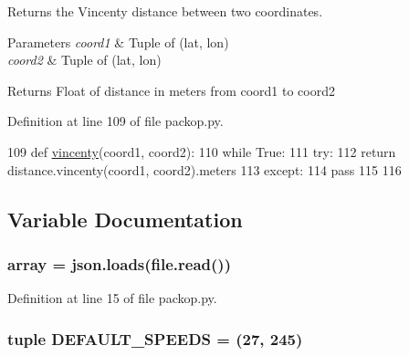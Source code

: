 Returns the Vincenty distance between two coordinates. 


\begin{DoxyParams}{Parameters}
{\em coord1} & Tuple of (lat, lon) \\
\hline
{\em coord2} & Tuple of (lat, lon)\\
\hline
\end{DoxyParams}
\begin{DoxyReturn}{Returns}
Float of distance in meters from coord1 to coord2 
\end{DoxyReturn}


Definition at line 109 of file packop.\+py.


\begin{DoxyCode}
109 \textcolor{keyword}{def }\hyperlink{namespacesrc_1_1packop_ac16b65508182630b4ab800bffc0d06f0}{vincenty}(coord1, coord2):
110     \textcolor{keywordflow}{while} \textcolor{keyword}{True}:
111         \textcolor{keywordflow}{try}:
112             \textcolor{keywordflow}{return} distance.vincenty(coord1, coord2).meters
113         \textcolor{keywordflow}{except}:
114             \textcolor{keywordflow}{pass}
115 
116 
\end{DoxyCode}


\subsection{Variable Documentation}
\subsubsection[{\texorpdfstring{array}{array}}]{\setlength{\rightskip}{0pt plus 5cm}array = json.\+loads(file.\+read())}\hypertarget{namespacesrc_1_1packop_a41ab4b8b4e6b05e8489555b1bbc7f845}{}\label{namespacesrc_1_1packop_a41ab4b8b4e6b05e8489555b1bbc7f845}


Definition at line 15 of file packop.\+py.

\subsubsection[{\texorpdfstring{D\+E\+F\+A\+U\+L\+T\+\_\+\+S\+P\+E\+E\+DS}{DEFAULT_SPEEDS}}]{\setlength{\rightskip}{0pt plus 5cm}tuple D\+E\+F\+A\+U\+L\+T\+\_\+\+S\+P\+E\+E\+DS = (27, 245)}\hypertarget{namespacesrc_1_1packop_a21bd10200165ff80dfb55057200f8532}{}\label{namespacesrc_1_1packop_a21bd10200165ff80dfb55057200f8532}


